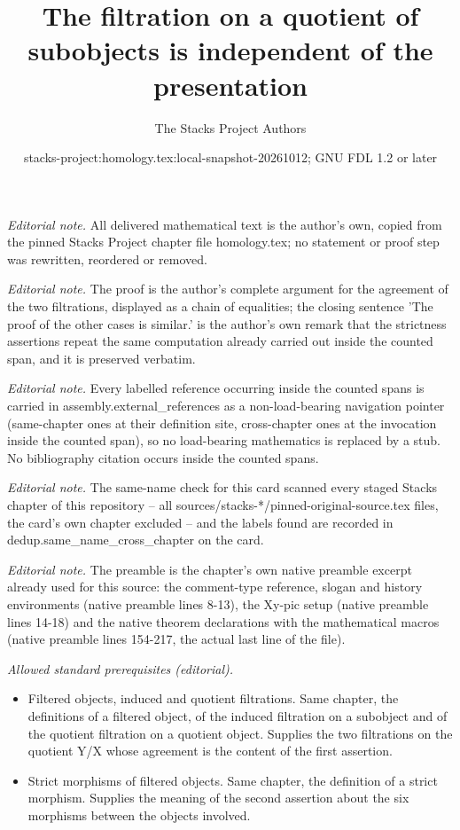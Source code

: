 \documentclass[10pt,a4paper]{amsart}
\title{The filtration on a quotient of subobjects is independent of the presentation}
\author{The Stacks Project Authors}
\date{stacks-project:homology.tex:local-snapshot-20261012; GNU FDL 1.2 or later}
\theoremstyle{plain}
\theoremstyle{definition}
\theoremstyle{remark}
\numberwithin{equation}{subsection}
\begin{document}
\maketitle
\noindent\textit{Editorial note.} All delivered mathematical text is the author's own, copied from the pinned Stacks Project chapter file homology.tex; no statement or proof step was rewritten, reordered or removed.\par\medskip
\noindent\textit{Editorial note.} The proof is the author's complete argument for the agreement of the two filtrations, displayed as a chain of equalities; the closing sentence 'The proof of the other cases is similar.' is the author's own remark that the strictness assertions repeat the same computation already carried out inside the counted span, and it is preserved verbatim.\par\medskip
\noindent\textit{Editorial note.} Every labelled reference occurring inside the counted spans is carried in assembly.external\_references as a non-load-bearing navigation pointer (same-chapter ones at their definition site, cross-chapter ones at the invocation inside the counted span), so no load-bearing mathematics is replaced by a stub. No bibliography citation occurs inside the counted spans.\par\medskip
\noindent\textit{Editorial note.} The same-name check for this card scanned every staged Stacks chapter of this repository -- all sources/stacks-*/pinned-original-source.tex files, the card's own chapter excluded -- and the labels found are recorded in dedup.same\_name\_cross\_chapter on the card.\par\medskip
\noindent\textit{Editorial note.} The preamble is the chapter's own native preamble excerpt already used for this source: the comment-type reference, slogan and history environments (native preamble lines 8-13), the Xy-pic setup (native preamble lines 14-18) and the native theorem declarations with the mathematical macros (native preamble lines 154-217, the actual last line of the file).\par\medskip
\noindent\textit{Allowed standard prerequisites (editorial).}\begin{itemize}
\item Filtered objects, induced and quotient filtrations. Same chapter, the definitions of a filtered object, of the induced filtration on a subobject and of the quotient filtration on a quotient object. Supplies the two filtrations on the quotient Y/X whose agreement is the content of the first assertion.
\item Strict morphisms of filtered objects. Same chapter, the definition of a strict morphism. Supplies the meaning of the second assertion about the six morphisms between the objects involved.
\end{itemize}\medskip
\end{document}
